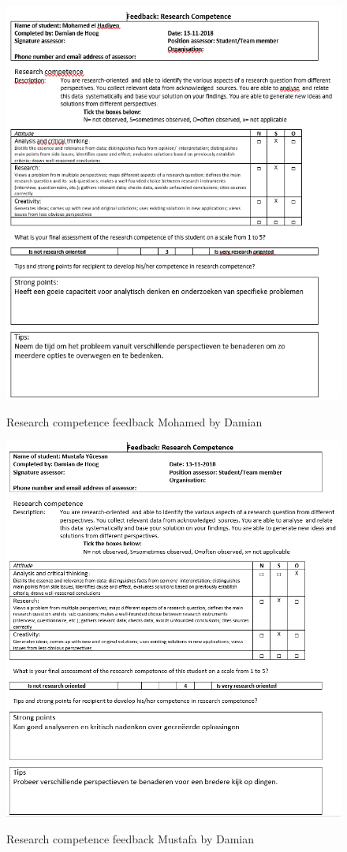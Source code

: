 \documentclass[12pt]{article}
\begin{document}
	\begin{figure}[p!]
		\centering
		\includegraphics[width=\columnwidth]{ResSklMohamed.PNG}\\
		\caption{Research competence feedback Mohamed by Damian}
	\end{figure}
	\begin{figure}[p!]
		\centering
		\includegraphics[width=\columnwidth]{ResSklMustafa.PNG}\\
		\caption{Research competence feedback Mustafa by Damian}
	\end{figure}
\end{document}
